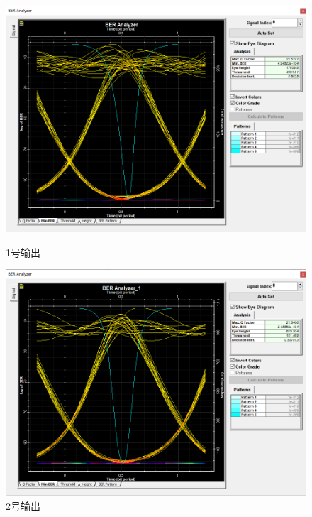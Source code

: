 \documentclass[12pt]{article}
\begin{document}
\begin{figure}[H]
    \begin{minipage}[t]{0.5\linewidth}
        \centering
        \includegraphics[scale=0.5]{sweep2BER1.png}
        \caption{1号输出}
        \label{fig:side:a}
      \end{minipage}%
      \begin{minipage}[t]{0.5\linewidth}
        \centering
        \includegraphics[scale=0.5]{sweep2BER2.png}
        \caption{2号输出}
        \label{fig:side:b}
      \end{minipage}
	  \begin{minipage}[t]{0.5\linewidth}
        \centering

\end{minipage}
\end{figure}
\end{document}
